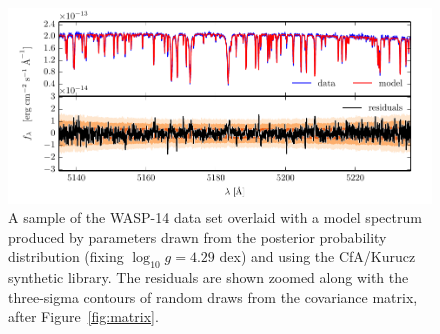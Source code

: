 \documentclass[iop,floatfix]{emulateapj}
\begin{document}
\begin{figure}[!htb]
\begin{center}
\includegraphics{figs/residuals_Kurucz_logg.pdf}
\caption{A sample of the WASP-14 data set overlaid with a model spectrum produced by parameters drawn from the posterior probability distribution (fixing $\log_{10} g = 4.29$ dex) and using the {\sc CfA/Kurucz} synthetic library. The residuals are shown zoomed along with the three-sigma contours of random draws from the covariance matrix, after Figure~\ref{fig:matrix}.}
\label{fig:Kurucz_residuals}
\end{center}
\end{figure}
\end{document}
